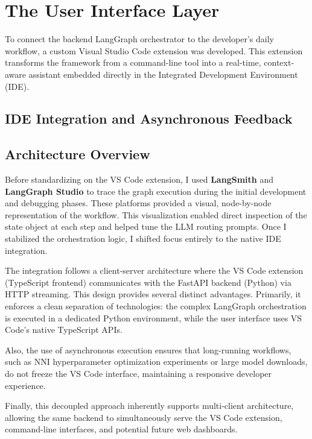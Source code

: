 \section{The User Interface Layer}

To connect the backend LangGraph orchestrator to the developer's daily workflow, a custom Visual Studio Code extension was developed. This extension transforms the framework from a command-line tool into a real-time, context-aware assistant embedded directly in the Integrated Development Environment (IDE).

\subsection{IDE Integration and Asynchronous Feedback}
\label{sec:vscode_integration}

\subsection{Architecture Overview}

Before standardizing on the VS Code extension, I used \textbf{LangSmith} and \textbf{LangGraph Studio} to trace the graph execution during the initial development and debugging phases. These platforms provided a visual, node-by-node representation of the workflow. This visualization enabled direct inspection of the state object at each step and helped tune the LLM routing prompts. Once I stabilized the orchestration logic, I shifted focus entirely to the native IDE integration.

The integration follows a client-server architecture where the VS Code extension (TypeScript frontend) communicates with the FastAPI backend (Python) via HTTP streaming. This design provides several distinct advantages. Primarily, it enforces a clean separation of technologies: the complex LangGraph orchestration is executed in a dedicated Python environment, while the user interface uses VS Code's native TypeScript APIs.

Also, the use of asynchronous execution ensures that long-running workflows, such as NNI hyperparameter optimization experiments or large model downloads, do not freeze the VS Code interface, maintaining a responsive developer experience.

Finally, this decoupled approach inherently supports multi-client architecture, allowing the same backend to simultaneously serve the VS Code extension, command-line interfaces, and potential future web dashboards.

